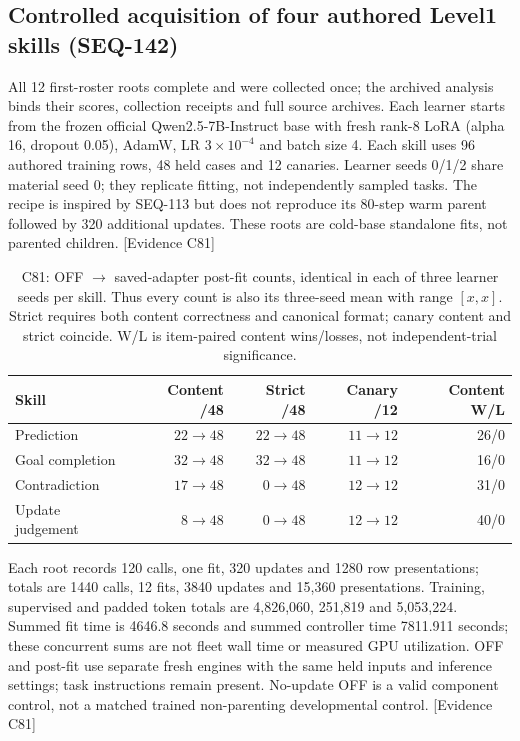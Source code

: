 \documentclass{article}
\begin{document}
\subsection{Controlled acquisition of four authored Level1 skills (SEQ-142)}
\label{sec:bounded-level1}
All 12 first-roster roots complete and were collected once; the archived analysis
binds their scores, collection receipts and full source archives. Each learner
starts from the frozen official Qwen2.5-7B-Instruct base with fresh rank-8 LoRA
(alpha 16, dropout 0.05), AdamW, LR $3\times10^{-4}$ and batch size 4. Each skill
uses 96 authored training rows, 48 held cases and 12 canaries. Learner seeds 0/1/2
share material seed 0; they replicate fitting, not independently sampled tasks.
The recipe is inspired by SEQ-113 but does not reproduce its 80-step warm parent
followed by 320 additional updates. These roots are cold-base standalone fits,
not parented children. \textsf{[Evidence C81]}

\begin{table}[htbp]
\centering\small
\begin{tabular}{lrrrr}
\toprule
Skill & Content /48 & Strict /48 & Canary /12 & Content W/L \\
\midrule
Prediction & $22\to48$ & $22\to48$ & $11\to12$ & 26/0 \\
Goal completion & $32\to48$ & $32\to48$ & $11\to12$ & 16/0 \\
Contradiction & $17\to48$ & $0\to48$ & $12\to12$ & 31/0 \\
Update judgement & $8\to48$ & $0\to48$ & $12\to12$ & 40/0 \\
\bottomrule
\end{tabular}
\caption{C81: OFF $\to$ saved-adapter post-fit counts, identical in each of three
learner seeds per skill. Thus every count is also its three-seed mean with
range $[x,x]$. Strict requires both content correctness and canonical format;
canary content and strict coincide. W/L is item-paired content wins/losses,
not independent-trial significance.}
\label{tab:bounded-level1}
\end{table}

Each root records 120 calls, one fit, 320 updates and 1280 row presentations;
totals are 1440 calls, 12 fits, 3840 updates and 15,360 presentations. Training,
supervised and padded token totals are 4,826,060, 251,819 and 5,053,224.
Summed fit time is 4646.8 seconds and summed controller time 7811.911 seconds;
these concurrent sums are not fleet wall time or measured GPU utilization.
OFF and post-fit use separate fresh engines with the same held inputs and
inference settings; task instructions remain present. No-update OFF is a valid
component control, not a matched trained non-parenting developmental control.
\textsf{[Evidence C81]}
\end{document}
